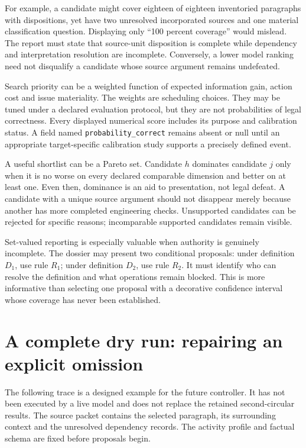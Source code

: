 For example, a candidate might cover eighteen of eighteen inventoried paragraphs
with dispositions, yet have two unresolved incorporated sources and one material
classification question. Displaying only ``100 percent coverage'' would mislead.
The report must state that source-unit disposition is complete while dependency
and interpretation resolution are incomplete. Conversely, a lower model ranking
need not disqualify a candidate whose source argument remains undefeated.


Search priority can be a weighted function of expected information gain, action
cost and issue materiality. The weights are scheduling choices. They may be tuned
under a declared evaluation protocol, but they are not probabilities of legal
correctness. Every displayed numerical score includes its purpose and calibration
status. A field named \texttt{probability\_correct} remains absent or null until an
appropriate target-specific calibration study supports a precisely defined event.

A useful shortlist can be a Pareto set. Candidate $h$ dominates candidate $j$ only
when it is no worse on every declared comparable dimension and better on at least
one. Even then, dominance is an aid to presentation, not legal defeat. A candidate
with a unique source argument should not disappear merely because another has
more completed engineering checks. Unsupported candidates can be rejected for
specific reasons; incomparable supported candidates remain visible.

Set-valued reporting is especially valuable when authority is genuinely
incomplete. The dossier may present two conditional proposals: under definition
$D_1$, use rule $R_1$; under definition $D_2$, use rule $R_2$. It must identify who
can resolve the definition and what operations remain blocked. This is more
informative than selecting one proposal with a decorative confidence interval
whose coverage has never been established.

\section{A complete dry run: repairing an explicit omission}
\label{merge:M06:20}


The following trace is a designed example for the future controller. It has not
been executed by a live model and does not replace the retained second-circular
results. The source packet contains the selected paragraph, its surrounding
context and the unresolved dependency records. The activity profile and factual
schema are fixed before proposals begin.

